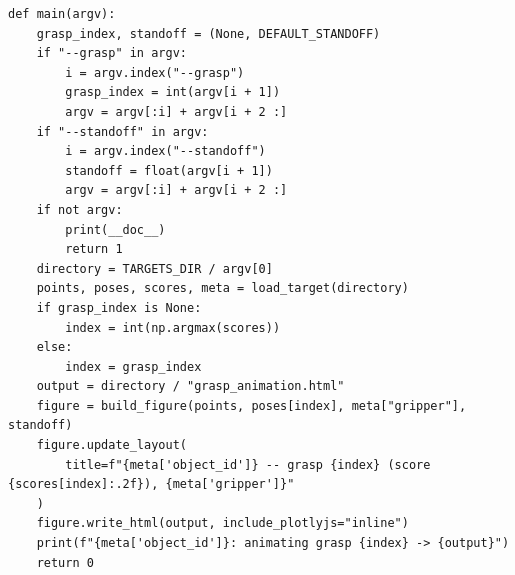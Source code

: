 \documentclass[11pt,a4paper]{book}
\begin{document}
\begin{lstlisting}[firstnumber=268]
def main(argv):
    grasp_index, standoff = (None, DEFAULT_STANDOFF)
    if "--grasp" in argv:
        i = argv.index("--grasp")
        grasp_index = int(argv[i + 1])
        argv = argv[:i] + argv[i + 2 :]
    if "--standoff" in argv:
        i = argv.index("--standoff")
        standoff = float(argv[i + 1])
        argv = argv[:i] + argv[i + 2 :]
    if not argv:
        print(__doc__)
        return 1
    directory = TARGETS_DIR / argv[0]
    points, poses, scores, meta = load_target(directory)
    if grasp_index is None:
        index = int(np.argmax(scores))
    else:
        index = grasp_index
    output = directory / "grasp_animation.html"
    figure = build_figure(points, poses[index], meta["gripper"], standoff)
    figure.update_layout(
        title=f"{meta['object_id']} -- grasp {index} (score {scores[index]:.2f}), {meta['gripper']}"
    )
    figure.write_html(output, include_plotlyjs="inline")
    print(f"{meta['object_id']}: animating grasp {index} -> {output}")
    return 0


\end{lstlisting}
\end{document}
